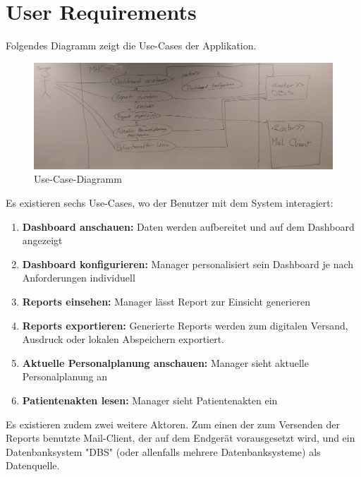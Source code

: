 \documentclass[a4paper]{scrreprt}
\begin{document}
\section{User Requirements}
Folgendes Diagramm zeigt die Use-Cases der Applikation.

\begin{figure}[htbp]
\includegraphics[width=1\textwidth]{img/use_case_diagram_20160401.png}
\caption[Use-Case-Diagramm]{Use-Case-Diagramm}
\end{figure}

\bigskip

Es existieren sechs Use-Cases, wo der Benutzer mit dem System interagiert:
\begin{enumerate}
\item \textbf{Dashboard anschauen:} Daten werden aufbereitet und auf dem Dashboard angezeigt
\item \textbf{Dashboard konfigurieren:} Manager personalisiert sein Dashboard je nach Anforderungen individuell
\item \textbf{Reports einsehen:} Manager lässt Report zur Einsicht generieren
\item \textbf{Reports exportieren:} Generierte Reports werden zum digitalen Versand, Ausdruck oder lokalen Abspeichern exportiert.
\item \textbf{Aktuelle Personalplanung anschauen:} Manager sieht aktuelle Personalplanung an
\item \textbf{Patientenakten lesen:} Manager sieht Patientenakten ein
\end{enumerate}

Es existieren zudem zwei weitere Aktoren. Zum einen der zum Versenden der Reports benutzte Mail-Client, der auf dem Endgerät vorausgesetzt wird, und ein Datenbanksystem "DBS" (oder allenfalls mehrere Datenbanksysteme) als Datenquelle.
\end{document}
